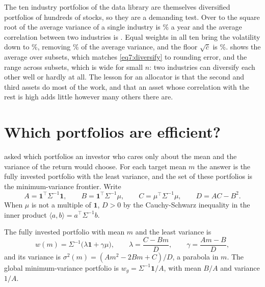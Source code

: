 \begin{chapterrefs}
The ten industry portfolios of the data library are themselves diversified portfolios of hundreds of
stocks, so they are a demanding test. Over \fqFirst{} to \fqLast{} the square root of the average variance of a
single industry is \dvOne\% a year and the average correlation between two industries is \dvRhoBar. Equal
weights in all ten bring the volatility down to \dvTen\%, removing \dvShare\% of the average
variance, and the floor $\sqrt{\bar c}$ is \dvLimit\%.  shows the average over
subsets, which matches \cref{eq7:diversify} to rounding error, and the range across subsets, which is
wide for small $n$: two industries can diversify each other well or hardly at all. The lesson for an
allocator is that the second and third assets do most of the work, and that an asset whose
correlation with the rest is high adds little however many others there are.


\FloatBarrier
\section{Which portfolios are efficient?}
\label{sec7:frontier}

\textcite{markowitz1952} asked which portfolios an investor who cares only about the mean and the
variance of the return would choose. For each target mean $m$ the answer is the fully invested
portfolio with the least variance, and the set of these portfolios is the minimum-variance frontier.
Write
\begin{equation}\label{eq7:abcd}
  A=\mathbf 1^\top\Sigma^{-1}\mathbf 1,\qquad B=\mathbf 1^\top\Sigma^{-1}\mu,\qquad C=\mu^\top\Sigma^{-1}\mu,
  \qquad D=AC-B^2 .
\end{equation}
When $\mu$ is not a multiple of $\mathbf 1$, $D>0$ by the Cauchy-Schwarz inequality in the inner
product $\langle a,b\rangle=a^\top\Sigma^{-1}b$.

\begin{proposition}\label{prop7:frontier}
The fully invested portfolio with mean $m$ and the least variance is
\begin{equation}\label{eq7:frontier}
  w(m)=\Sigma^{-1}\bigl(\lambda\mathbf 1+\gamma\mu\bigr),\qquad \lambda=\frac{C-Bm}{D},\qquad \gamma=\frac{Am-B}{D},
\end{equation}
and its variance is $\sigma^2(m)=(Am^2-2Bm+C)/D$, a parabola in $m$. The global minimum-variance
portfolio is $w_g=\Sigma^{-1}\mathbf 1/A$, with mean $B/A$ and variance $1/A$.
\end{proposition}


\end{chapterrefs}
